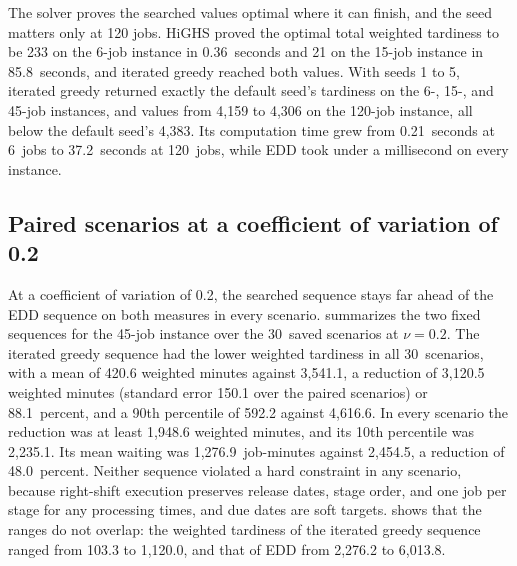 \sumpara The solver proves the searched values optimal where it can finish, and the seed matters only at 120 jobs. \sumparaend
\fin HiGHS proved the optimal total weighted tardiness to be 233 on the 6-job instance in 0.36~seconds and 21 on the 15-job instance in 85.8~seconds, and iterated greedy reached both values. \fine
\fin With seeds 1 to 5, iterated greedy returned exactly the default seed's tardiness on the 6-, 15-, and 45-job instances, and values from 4,159 to 4,306 on the 120-job instance, all below the default seed's 4,383. \fine
\fin Its computation time grew from 0.21~seconds at 6~jobs to 37.2~seconds at 120~jobs, while EDD took under a millisecond on every instance. \fine

\subsection{Paired scenarios at a coefficient of variation of 0.2}\label{sec:stress-results}

\sumpara At a coefficient of variation of 0.2, the searched sequence stays far ahead of the EDD sequence on both measures in every scenario. \sumparaend
\fin {} summarizes the two fixed sequences for the 45-job instance over the 30~saved scenarios at $\nu = 0.2$. \fine
\fin The iterated greedy sequence had the lower weighted tardiness in all 30~scenarios, with a mean of 420.6 weighted minutes against 3,541.1, a reduction of 3,120.5 weighted minutes (standard error 150.1 over the paired scenarios) or 88.1~percent, and a 90th percentile of 592.2 against 4,616.6. \fine
\fin In every scenario the reduction was at least 1,948.6 weighted minutes, and its 10th percentile was 2,235.1. \fine
\fin Its mean waiting was 1,276.9~job-minutes against 2,454.5, a reduction of 48.0~percent. \fine
\fin Neither sequence violated a hard constraint in any scenario, because right-shift execution preserves release dates, stage order, and one job per stage for any processing times, and due dates are soft targets. \fine
\fin {} shows that the ranges do not overlap: the weighted tardiness of the iterated greedy sequence ranged from 103.3 to 1,120.0, and that of EDD from 2,276.2 to 6,013.8. \fine

